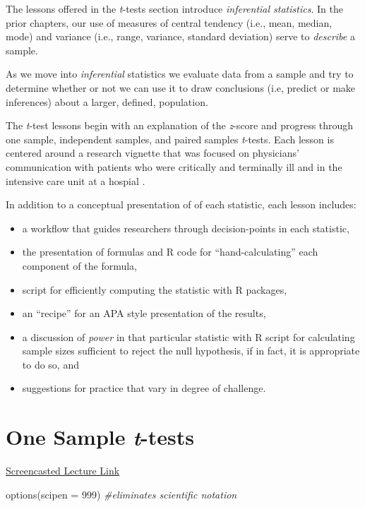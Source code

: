 \documentclass[
  11pt,
]{book}
\newenvironment{Shaded}{\begin{snugshade}}{\end{snugshade}}
\newcommand{\AttributeTok}[1]{\textcolor[rgb]{0.77,0.63,0.00}{#1}}
\newcommand{\CommentTok}[1]{\textcolor[rgb]{0.56,0.35,0.01}{\textit{#1}}}
\newcommand{\DecValTok}[1]{\textcolor[rgb]{0.00,0.00,0.81}{#1}}
\newcommand{\FunctionTok}[1]{\textcolor[rgb]{0.00,0.00,0.00}{#1}}
\newcommand{\NormalTok}[1]{#1}
\providecommand{\tightlist}{%
  \setlength{\itemsep}{0pt}\setlength{\parskip}{0pt}}
\begin{document}
The lessons offered in the \emph{t}-tests section introduce \emph{inferential statistics}. In the prior chapters, our use of measures of central tendency (i.e., mean, median, mode) and variance (i.e., range, variance, standard deviation) serve to \emph{describe} a sample.

As we move into \emph{inferential} statistics we evaluate data from a sample and try to determine whether or not we can use it to draw conclusions (i.e, predict or make inferences) about a larger, defined, population.

The \emph{t}-test lessons begin with an explanation of the \emph{z}-score and progress through one sample, independent samples, and paired samples \emph{t}-tests. Each lesson is centered around a research vignette that was focused on physicians' communication with patients who were critically and terminally ill and in the intensive care unit at a hospial \citep{elliott_differences_2016}.

In addition to a conceptual presentation of of each statistic, each lesson includes:

\begin{itemize}
\tightlist
\item
  a workflow that guides researchers through decision-points in each statistic,
\item
  the presentation of formulas and R code for ``hand-calculating'' each component of the formula,
\item
  script for efficiently computing the statistic with R packages,
\item
  an ``recipe'' for an APA style presentation of the results,
\item
  a discussion of \emph{power} in that particular statistic with R script for calculating sample sizes sufficient to reject the null hypothesis, if in fact, it is appropriate to do so, and
\item
  suggestions for practice that vary in degree of challenge.
\end{itemize}

\hypertarget{tOneSample}{%
\chapter{\texorpdfstring{One Sample \emph{t}-tests}{One Sample t-tests}}\label{tOneSample}}

\href{link\%20here}{Screencasted Lecture Link}

\begin{Shaded}
\begin{Highlighting}[]
\FunctionTok{options}\NormalTok{(}\AttributeTok{scipen =} \DecValTok{999}\NormalTok{)  }\CommentTok{\#eliminates scientific notation}
\end{Highlighting}
\end{Shaded}
\end{document}
